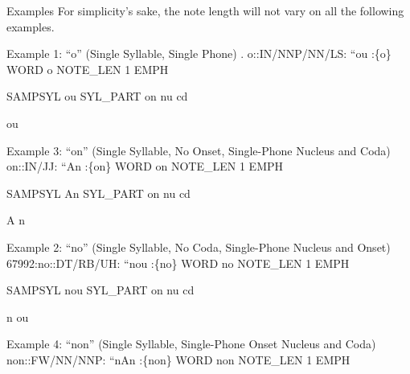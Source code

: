 \documentclass[10pt,oneside]{memoir}
\title{\mytitle}
\author{\myauthor}
\def\mychapterstyle{default}
\def\mypagestyle{headings}
\def\revision{}
\begin{document}
\chapterstyle{\mychapterstyle}
\pagestyle{\mypagestyle}

%
%

\frontmatter



\maketitle
\clearpage

\vspace*{\fill}

\setlength{\parindent}{0pt}

\ifx\mycopyright\undefined
\else
	\textcopyright{} \mycopyright
\fi

\revision

\begin{center}
\end{center}

\setlength{\parindent}{1em}
\clearpage

\tableofcontents


%
%


\setlength{\parindent}{1em}

\mainmatter
Examples
For simplicity's sake, the note length will not vary on all the following examples.


\pagebreak Example 1: ``o'' 
(Single Syllable, Single Phone)               .
o::IN/NNP/NN/LS: ``ou :\{o\}
WORD
o
NOTE\_LEN
1
EMPH


SAMPSYL
ou
SYL\_PART
on
nu
cd


ou


Example 3: ``on'' 
(Single Syllable, No Onset, Single-Phone Nucleus and Coda)
on::IN/JJ: ``An :\{on\}
WORD
on
NOTE\_LEN
1
EMPH


SAMPSYL
An
SYL\_PART
on
nu
cd


A
n


Example 2: ``no'' 
(Single Syllable, No Coda, Single-Phone Nucleus and Onset)
67992:no::DT/RB/UH: ``nou :\{no\}
WORD
no
NOTE\_LEN
1
EMPH


SAMPSYL
nou
SYL\_PART
on
nu
cd


n
ou


Example 4: ``non'' 
(Single Syllable, Single-Phone Onset Nucleus and Coda)
non::FW/NN/NNP: ``nAn :\{non\}
WORD
non
NOTE\_LEN
1
EMPH
\end{document}
